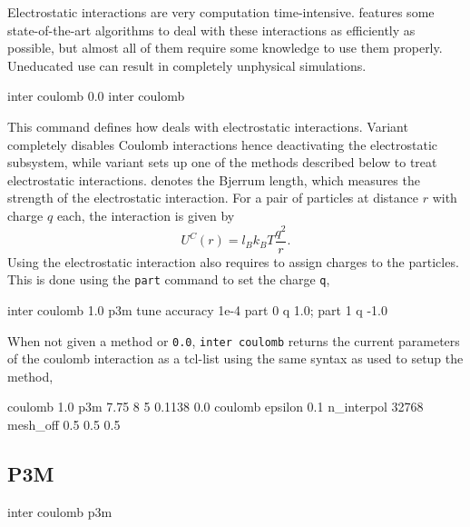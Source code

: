 Electrostatic interactions are very computation time-intensive. \es{} features
some state-of-the-art algorithms to deal with these interactions as efficiently
as possible, but almost all of them require some knowledge to use them properly.
Uneducated use can result in completely unphysical simulations.

\begin{essyntax}
   inter coulomb 0.0
   inter coulomb  
\end{essyntax}

This command defines how \es{} deals with electrostatic interactions. Variant
 completely disables Coulomb interactions hence deactivating the
electrostatic subsystem, while variant  sets up one of the methods
described below to treat electrostatic interactions.  denotes the
Bjerrum length, which measures the strength of the electrostatic interaction.
For a pair of particles at distance $r$ with charge $q$ each, the interaction is given by
\begin{equation}
  U^C(r)=l_B k_B T\frac{q^2}{r}.
\end{equation}
Using the electrostatic interaction also requires to assign charges to the
particles. This is done using the \texttt{part} command to set the charge
\texttt{q}, \eg

\begin{tclcode}
  inter coulomb 1.0 p3m tune accuracy 1e-4
  part 0 q 1.0; part 1 q -1.0
\end{tclcode}

When not given a method or \texttt{0.0}, \texttt{inter coulomb} returns the
current parameters of the coulomb interaction as a tcl-list using the same
syntax as used to setup the method, \eg

\begin{tclcode}
  {coulomb 1.0 p3m 7.75 8 5 0.1138 0.0}
  {coulomb epsilon 0.1 n_interpol 32768 mesh_off 0.5 0.5 0.5}
\end{tclcode}

\subsection{P3M}

\begin{essyntax}
  inter coulomb p3m    
\end{essyntax}

